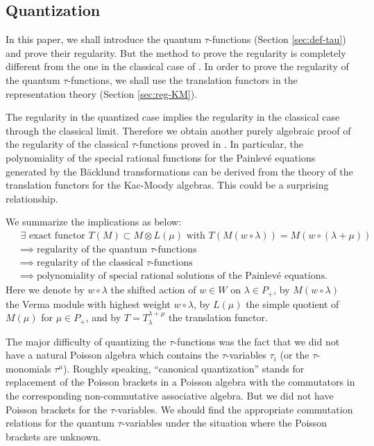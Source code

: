 \documentclass[12pt,twoside]{article}
\theoremstyle{plain} %
\theoremstyle{definition} %
\theoremstyle{definition} %
\numberwithin{theorem}{section}
\numberwithin{equation}{section}
\numberwithin{figure}{section}
\numberwithin{table}{section}
\newcommand\secref[1]{Section \ref{#1}}
\begin{document}

\subsection{Quantization}

In this paper, we shall introduce the quantum $\tau$-functions 
(\secref{sec:def-tau}) and prove their regularity.  
But the method to prove the regularity is completely different
from the one in the classical case of \cite{NY0012028}.
In order to prove the regularity of the quantum $\tau$-functions, 
we shall use the translation functors in the representation theory
(\secref{sec:reg-KM}). 

The regularity in the quantized case implies the regularity in the classical case
through the classical limit.
Therefore we obtain another purely algebraic proof of the regularity 
of the classical $\tau$-functions proved in \cite{NY0012028}.
In particular, 
the polynomiality of the special rational functions 
for the Painlev\'e equations generated by the B\"acklund transformations 
can be derived from the theory of the translation functors for the Kac-Moody algebras.
This could be a surprising relationship.

We summarize the implications as below:
\begin{align*}
 &
 \text{
   $\exists$ exact functor 
   $T(M)\subset M\otimes L(\mu)$ with 
   $T(M(w\circ\lambda))=M(w\circ(\lambda+\mu))$
 }
 \\ &
 \implies
 \text{regularity of the quantum $\tau$-functions}
 \\ &
 \implies
 \text{regularity of the classical $\tau$-functions}
 \\ &
 \implies
 \text{polynomiality of special rational solutions of the Painlev\'e equations}.
\end{align*}
Here we denote 
by $w\circ\lambda$ the shifted action of $w\in W$ on $\lambda\in P_+$, 
by $M(w\circ\lambda)$ the Verma module with highest weight $w\circ\lambda$, 
by $L(\mu)$ the simple quotient of $M(\mu)$ for $\mu\in P_+$,
and by $T=T_\lambda^{\lambda+\mu}$ the translation functor.

The major difficulty of quantizing the $\tau$-functions was the fact that
we did not have a natural Poisson algebra which contains the $\tau$-variables $\tau_i$
(or the $\tau$-monomials $\tau^\mu$).
Roughly speaking, ``canonical quantization'' stands for
replacement of the Poisson brackets in a Poisson algebra
with the commutators in the corresponding non-commutative associative algebra.
But we did not have Poisson brackets for the $\tau$-variables.
We should find the appropriate commutation relations for the quantum $\tau$-variables
under the situation where the Poisson brackets are unknown.
\end{document}
